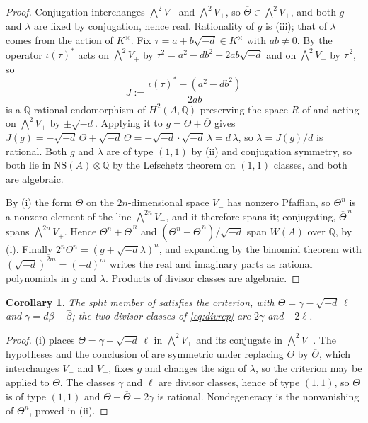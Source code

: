 \documentclass[11pt,reqno]{amsart}
\theoremstyle{plain}
\newtheorem{corollary}[theorem]{Corollary}
\theoremstyle{definition}
\theoremstyle{remark}
\newcommand{\QQ}{\mathbb{Q}}
\newcommand{\HW}{W}                      %
\newcommand{\NS}{\mathrm{NS}}
\newcommand{\Kx}{K^{\times}}
\newcommand{\bbar}[1]{\overline{#1}}
\begin{document}
\begin{proof}
Conjugation interchanges $\bigwedge^{2}V_{-}$ and $\bigwedge^{2}V_{+}$, so
$\bbar{\Theta}\in\bigwedge^{2}V_{+}$, and both $g$ and $\lambda$ are fixed by
conjugation, hence real. Rationality of $g$ is (iii); that of $\lambda$
comes from the action of $\Kx$. Fix
$\tau=a+b\sqrt{-d}\in\Kx$ with $ab\ne0$. By  the operator
$\iota(\tau)^{*}$ acts on $\bigwedge^{2}V_{+}$ by $\tau^{2}=a^{2}-db^{2}+2ab\sqrt{-d}$
and on $\bigwedge^{2}V_{-}$ by $\bbar{\tau}^{\,2}$, so
\[
  J:=\frac{\iota(\tau)^{*}-(a^{2}-db^{2})}{2ab}
\]
is a $\QQ$-rational endomorphism of $H^{2}(A,\QQ)$ preserving the space $R$
of  and acting
on $\bigwedge^{2}V_{\pm}$ by $\pm\sqrt{-d}$. Applying it to
$g=\Theta+\bbar{\Theta}$ gives $J(g)=-\sqrt{-d}\,\Theta+\sqrt{-d}\,\bbar{\Theta}
=-\sqrt{-d}\cdot\sqrt{-d}\,\lambda=d\,\lambda$, so $\lambda=J(g)/d$ is
rational. Both $g$ and $\lambda$ are of type $(1,1)$ by (ii) and conjugation
symmetry, so both lie in $\NS(A)\otimes\QQ$ by the Lefschetz theorem on
$(1,1)$ classes, and both are algebraic.

By (i) the form $\Theta$ on the $2n$-dimensional space $V_{-}$ has nonzero
Pfaffian, so $\Theta^{n}$ is a nonzero element of the line
$\bigwedge^{2n}V_{-}$, and it therefore spans it; conjugating,
$\bbar{\Theta}^{\,n}$ spans $\bigwedge^{2n}V_{+}$. Hence
$\Theta^{n}+\bbar{\Theta}^{\,n}$ and
$(\Theta^{n}-\bbar{\Theta}^{\,n})/\sqrt{-d}$ span $\HW(A)$ over $\QQ$, by
(i). Finally
$2^{n}\Theta^{n}=(g+\sqrt{-d}\lambda)^{n}$, and expanding by the binomial
theorem with $(\sqrt{-d})^{2m}=(-d)^{m}$ writes the real and imaginary parts
as rational polynomials in $g$ and $\lambda$. Products of divisor classes are
algebraic.
\end{proof}

\begin{corollary}\label{cor:splitsatisfies}
The split member of  satisfies the criterion, with
$\Theta=\gamma-\sqrt{-d}\,\ell$ and $\gamma=d\beta-\widehat{\beta}$; the two
divisor classes of \eqref{eq:divrep} are $2\gamma$ and $-2\ell$.
\end{corollary}

\begin{proof}
(i) places $\Theta=\gamma-\sqrt{-d}\,\ell$ in
$\bigwedge^{2}V_{+}$ and its conjugate in $\bigwedge^{2}V_{-}$. The hypotheses
and the conclusion of  are symmetric under replacing
$\Theta$ by $\bbar{\Theta}$, which interchanges $V_{+}$ and $V_{-}$, fixes $g$
and changes the sign of $\lambda$, so the criterion may be applied to
$\Theta$. The classes $\gamma$ and $\ell$ are divisor classes, hence of type
$(1,1)$, so $\Theta$ is of type $(1,1)$ and $\Theta+\bbar{\Theta}=2\gamma$ is
rational. Nondegeneracy is the nonvanishing of $\Theta^{n}$, proved in
(ii).
\end{proof}
\end{document}
